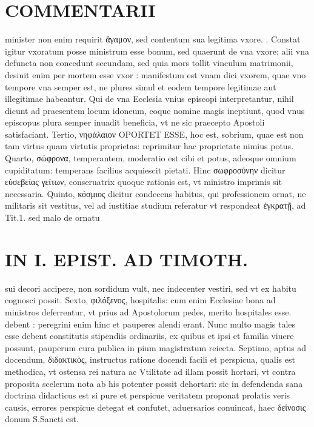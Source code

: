 \documentclass{article}
\begin{document}
\begin{pages}
\section*{COMMENTARII }
\marginpar{[ p.64 ]}\pstart minister non enim requirit ἄγαμον, sed contentum sua legitima vxore. .  \pend\pstart Constat igitur vxoratum posse ministrum esse bonum, sed quaerunt de vna vxore: alii vna defuncta non concedunt secundam, sed quia mors tollit vinculum matrimonii, desinit enim per mortem esse vxor : manifestum est vnam dici vxorem, quae vno tempore vna semper est, ne plures simul et eodem tempore legitimae aut illegitimae habeantur. Qui de vna Ecclesia vnius episcopi interpretantur, nihil dicunt ad praesentem locum idoneum, eoque nomine magis ineptiunt, quod vnus episcopus plura semper inuadit beneficia, vt ne sic praecepto Apostoli satisfaciant.  \pend\pstart Tertio, νηφάλαιον OPORTET ESSE, hoc est, sobrium, quae est non tam virtus quam virtutis proprietas: reprimitur hac proprietate nimius potus.  \pend\pstart Quarto, σώφρονα, temperantem, moderatio est cibi et potus, adeoque omnium cupiditatum: temperans facilius acquiescit pietati. Hinc σωφροσύνην dicitur εὐσεβείας γείτων, conseruatrix quoque rationis est, vt ministro imprimis sit necessaria.  \pend\pstart Quinto, κόσμιος dicitur condecens habitus, qui professionem ornat, ne militaris sit vestitus, vel ad iustitiae studium referatur vt respondeat ἐγκρατῇ, ad Tit.1. sed malo de ornatu  \pend
\section*{IN I. EPIST. AD TIMOTH. }
\marginpar{[ p.65 ]}\pstart sui decori accipere, non sordidum vult, nec indecenter vestiri, sed vt ex habitu cognosci possit.  \pend\pstart Sexto, φιλόξενος, hospitalis: cum enim Ecclesiae bona ad ministros deferrentur, vt prius ad Apostolorum pedes, merito hospitales esse. debent : peregrini enim hinc et pauperes alendi erant. Nunc multo magis tales esse debent constitutis stipendiis ordinariis, ex quibus et ipsi et familia viuere possunt, pauperum cura publica in pium magistratum reiecta. Septimo, aptus ad docendum, διδακτικὸς, instructus ratione docendi facili et perspicua, qualis est methodica, vt ostensa rei natura ac Vtilitate ad illam possit hortari, vt contra proposita scelerum nota ab his potenter possit dehortari: sic in defendenda sana doctrina didacticus est si pure et perspicue veritatem proponat prolatis veris causis, errores perspicue detegat et confutet, aduersarios conuincat, haec δείνοσις donum S.Sancti est.  \pend
{}
{}

\end{pages}
\end{document}
